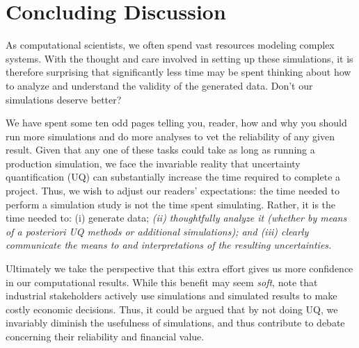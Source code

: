 \section{Concluding Discussion}


As computational scientists, we often spend vast resources modeling complex systems.  With the thought and care involved in setting up these simulations, it is therefore surprising that  significantly less time may be spent thinking about how to analyze and understand the validity of the generated data.  Don't our simulations deserve better? 

We have spent some ten odd pages telling you, reader, how and why you should run more simulations and do more analyses to vet the reliability of any given result.  Given that any one of these tasks could take as long as running a production simulation, we face the invariable reality that uncertainty quantification (UQ) can substantially increase the time required to complete a project.
Thus, we wish to adjust our readers' expectations: the time needed to perform a simulation study is not the time spent simulating.  Rather, it is the time needed to: (i) generate data; {\it (ii) thoughtfully analyze it (whether by means of a posteriori UQ methods or additional simulations); and (iii) clearly communicate the means to and interpretations of the resulting uncertainties.}


Ultimately we take the perspective that this extra effort gives us more confidence in our computational results.  While this benefit may seem {\it soft}, note that industrial stakeholders actively use simulations and simulated results to make costly economic decisions.  Thus, it could be argued that by not doing UQ, we invariably diminish the usefulness of simulations, and thus contribute to debate concerning their reliability and financial value.

